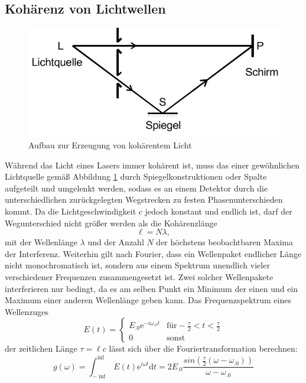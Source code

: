 \subsection{Kohärenz von Lichtwellen}
\begin{figure}
\centering
\includegraphics[scale=0.5]{content/images/kohaerenz.jpg}
\caption{Aufbau zur Erzeugung von kohärentem Licht\cite{V401}}
\label{fig:Kohärenz}
\end{figure}
\noindent Während das Licht eines Lasers immer kohärent ist, muss das einer gewöhnlichen Lichtquelle gemäß Abbildung \ref{fig:Kohärenz} durch Spiegelkonstruktionen oder Spalte aufgeteilt und umgelenkt werden, sodass es an einem Detektor durch die unterschiedlichen zurückgelegten Wegstrecken zu festen Phasenunterschieden kommt.
Da die Lichtgeschwindigkeit $c$ jedoch konstant und endlich ist, darf der Wegunterschied nicht größer werden als die Kohärenzlänge 
\[
\ell = N\lambda,
\]
mit der Wellenlänge $\lambda$ und der Anzahl $N$ der höchstens beobachtbaren Maxima der Interferenz.
Weiterhin gilt nach Fourier, dass ein Wellenpaket endlicher Länge nicht monochromatisch ist, sondern aus einem Spektrum unendlich vieler verschiedener Frequenzen zusammengesetzt ist. Zwei solcher Wellenpakete interferieren nur bedingt, da es am selben Punkt ein Minimum der einen und ein Maximum einer anderen Wellenlänge geben kann.\newline
Das Frequenzspektrum eines Wellenzuges 
\[
E(t)=\begin{cases}
E_.0\mathrm{e}^{-i\omega_.0t} & \text{für} -\frac{\tau}{2}<t<\frac{\tau}{2}\\
0 & \text{sonst}
\end{cases}
\]
der zeitlichen Länge $\tau=\ell c$ lässt sich über die Fouriertransformation berechnen:
\begin{equation*}
g(\omega)=\int_{-\inf}^{\inf}E(t)\mathrm{e}^{i\omega t}\mathrm{d}t=2E_.0\frac{sin(\frac{\tau}{2}(\omega-\omega_.0))}{\omega-\omega_.0}
\end{equation*}
